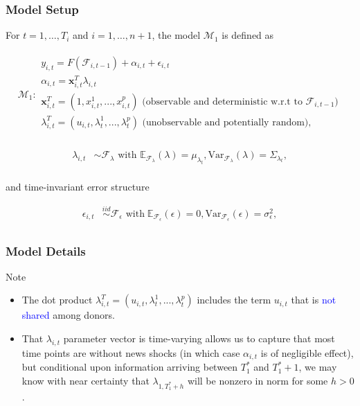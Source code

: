 \documentclass[9pt]{beamer}
\newcommand{\x}{\textbf{x}}
\newcommand{\simiid}{\stackrel{iid}{\sim}} %
\def\mrm#1{\mathrm{#1}} %
\def\mc#1{\mathcal{#1}} %
\def\E{\mathbb{E}} %
\def\mc#1{\mathcal{#1}}
\theoremstyle{definition}
\begin{document}
    \begin{frame}\frametitle{Model Setup}
    
    \fontsize{8}{7.2}
    
    For $t= 1, \ldots, T_i$ and $i = 1, \ldots, n+1$, the model $\mc{M}_1$ is defined as 

    \begin{align}
        \mc{M}_1 \colon 
    \begin{array}{l}
          y_{i,t} = F(\mathcal{F}_{i,t-1}) + \alpha_{i,t} + \epsilon_{i,t}\\[.2cm]
          \alpha_{i,t} = \x^{T}_{i,t}\lambda_{i,t} \\[.2cm]
         \x_{i,t}^{T} = (1,x^{1}_{i,t},...,x^{p}_{i,t}) \text{ (observable and deterministic w.r.t to } \mathcal{F}_{i,t-1})\\[.2cm] 
         \lambda_{i,t}^{T} = (u_{i,t},\lambda^{1}_{t},...,\lambda^{p}_{t}) \text{ (unobservable and potentially random)},\\[.2cm]
        \end{array}
    \end{align}

    \begin{align*}
    \lambda_{i,t} &\sim \mc{F}_{\lambda}\text{ with }  \E_{\mathcal{F}_{\lambda}}(\lambda) = \mu_{\lambda_{t}}, \mrm{Var}_{\mc{F}_{\lambda}}(\lambda) = \Sigma_{\lambda_{t}},\\
    \end{align*}

    and time-invariant error structure

    \begin{align*}
        \epsilon_{i,t} &\simiid \mc{F}_{\epsilon} \text{ with}  \; \E_{\mc{F}_{\epsilon}}(\epsilon) = 0, \mrm{Var}_{\mc{F}_{\epsilon}}(\epsilon)  = \sigma^{2}_{\epsilon},  \\
    \end{align*}
    
    \end{frame}

    \begin{frame}\frametitle{Model Details}
        Note
        \begin{itemize}
            
            \item The dot product  $\lambda_{i,t}^{T} = (u_{i,t},\lambda^{1}_{t},...,\lambda^{p}_{t})$ includes the term $u_{i,t}$ that is \textcolor{blue}{not shared} among donors.
            \item That $\lambda_{i,t}$ parameter vector is time-varying allows us to capture that most time points are without news shocks (in which case $\alpha_{i,t}$ is of negligible effect), but conditional upon information arriving between $T_{1}^{*}$ and $T_{1}^{*}+1$, we may know with near certainty that $\lambda_{1,T_{1}^{*}+h}$ will be nonzero in norm for some $h>0$. 
        \end{itemize}
    \end{frame}
    
\end{document}
